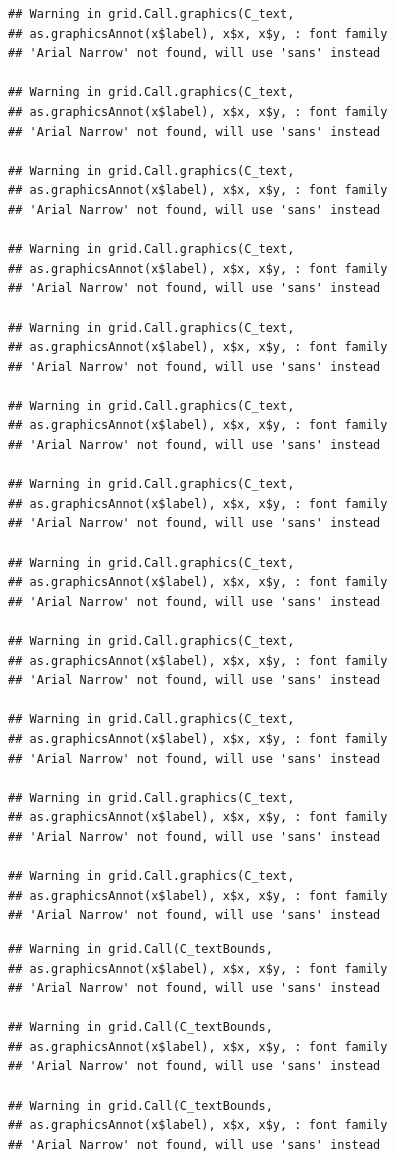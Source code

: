 \documentclass[]{krantz}
\begin{document}
\begin{verbatim}
## Warning in grid.Call.graphics(C_text,
## as.graphicsAnnot(x$label), x$x, x$y, : font family
## 'Arial Narrow' not found, will use 'sans' instead

## Warning in grid.Call.graphics(C_text,
## as.graphicsAnnot(x$label), x$x, x$y, : font family
## 'Arial Narrow' not found, will use 'sans' instead

## Warning in grid.Call.graphics(C_text,
## as.graphicsAnnot(x$label), x$x, x$y, : font family
## 'Arial Narrow' not found, will use 'sans' instead

## Warning in grid.Call.graphics(C_text,
## as.graphicsAnnot(x$label), x$x, x$y, : font family
## 'Arial Narrow' not found, will use 'sans' instead

## Warning in grid.Call.graphics(C_text,
## as.graphicsAnnot(x$label), x$x, x$y, : font family
## 'Arial Narrow' not found, will use 'sans' instead

## Warning in grid.Call.graphics(C_text,
## as.graphicsAnnot(x$label), x$x, x$y, : font family
## 'Arial Narrow' not found, will use 'sans' instead

## Warning in grid.Call.graphics(C_text,
## as.graphicsAnnot(x$label), x$x, x$y, : font family
## 'Arial Narrow' not found, will use 'sans' instead

## Warning in grid.Call.graphics(C_text,
## as.graphicsAnnot(x$label), x$x, x$y, : font family
## 'Arial Narrow' not found, will use 'sans' instead

## Warning in grid.Call.graphics(C_text,
## as.graphicsAnnot(x$label), x$x, x$y, : font family
## 'Arial Narrow' not found, will use 'sans' instead

## Warning in grid.Call.graphics(C_text,
## as.graphicsAnnot(x$label), x$x, x$y, : font family
## 'Arial Narrow' not found, will use 'sans' instead

## Warning in grid.Call.graphics(C_text,
## as.graphicsAnnot(x$label), x$x, x$y, : font family
## 'Arial Narrow' not found, will use 'sans' instead

## Warning in grid.Call.graphics(C_text,
## as.graphicsAnnot(x$label), x$x, x$y, : font family
## 'Arial Narrow' not found, will use 'sans' instead
\end{verbatim}

\begin{verbatim}
## Warning in grid.Call(C_textBounds,
## as.graphicsAnnot(x$label), x$x, x$y, : font family
## 'Arial Narrow' not found, will use 'sans' instead

## Warning in grid.Call(C_textBounds,
## as.graphicsAnnot(x$label), x$x, x$y, : font family
## 'Arial Narrow' not found, will use 'sans' instead

## Warning in grid.Call(C_textBounds,
## as.graphicsAnnot(x$label), x$x, x$y, : font family
## 'Arial Narrow' not found, will use 'sans' instead
\end{verbatim}
\end{document}
